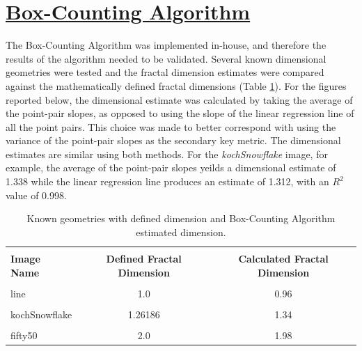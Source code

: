 \documentclass[12pt, oneside]{book}
\begin{document}
% 
%
\section{\underline{Box-Counting Algorithm}}
The Box-Counting Algorithm was implemented in-house, and therefore the results of the algorithm needed to be validated.  Several known dimensional geometries were tested and the fractal dimension estimates were compared against the mathematically defined fractal dimensions (Table \ref{tab:dim_compare}).  For the figures reported below, the dimensional estimate was calculated by taking the average of the point-pair slopes, as opposed to using the slope of the linear regression line of all the point pairs.  This choice was made to better correspond with using the variance of the point-pair slopes as the secondary key metric.  The dimensional estimates are similar using both methods.  For the \textit{kochSnowflake} image, for example, the average of the point-pair slopes yeilds a dimensional estimate of 1.338 while the linear regression line produces an estimate of 1.312, with an \(R^{2}\) value of 0.998.

\begin{table}[!b]
{\hspace{0cm}
\begin{tabular}{|p{3cm}|c|c|}
\hline & & \\ %
\textbf{Image Name}  & \textbf{Defined Fractal Dimension} & \textbf{Calculated Fractal Dimension}\\
\hline & &\\ %
line          & 1.0 & 0.96  \\
\hline & & \\ %
kochSnowflake & 1.26186 & 1.34  \\
\hline & &\\ %
fifty50       & 2.0 & 1.98  \\
\hline
\end{tabular}
}
\caption{Known geometries with defined dimension and Box-Counting Algorithm estimated dimension.}
\label{tab:dim_compare}
\end{table}




% 
%
\end{document}

